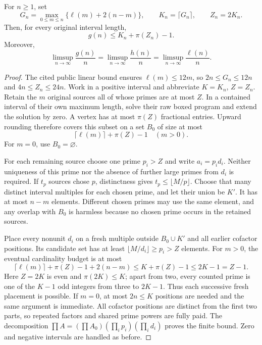 \begin{theorem}\label{thm:raw}
For $n\ge1$, set
\[
 G_n=\max_{0\le m\le n}\{\ell(m)+2(n-m)\},\qquad
 K_n=\lceil G_n\rceil,\qquad Z_n=2K_n.
\]
Then, for every original interval length,
\[
 g(n)\le K_n+\pi(Z_n)-1.
\]
Moreover,
\[
 \limsup_{n\to\infty}\frac{g(n)}n
 =\limsup_{n\to\infty}\frac{h(n)}n
 =\limsup_{n\to\infty}\frac{\ell(n)}n.
\]
\end{theorem}
\begin{proof}
The cited public linear bound ensures $\ell(m)\le12m$, so $2n\le G_n\le12n$ and $4n\le Z_n\le24n$. Work in a positive interval and abbreviate $K=K_n$, $Z=Z_n$. Retain the $m$ original sources all of whose primes are at most $Z$. In a contained interval of their own maximum length, solve their raw boxed program and extend the solution by zero. A vertex has at most $\pi(Z)$ fractional entries. Upward rounding therefore covers this subset on a set $B_0$ of size at most
\[
 \lceil\ell(m)\rceil+\pi(Z)-1\quad(m>0).
\]
For $m=0$, use $B_0=\varnothing$.

For each remaining source choose one prime $p_i>Z$ and write $a_i=p_id_i$. Neither uniqueness of this prime nor the absence of further large primes from $d_i$ is required. If $t_p$ sources chose $p$, distinctness gives $t_p\le\lfloor M/p\rfloor$. Choose that many distinct interval multiples for each chosen prime, and let their union be $K'$. It has at most $n-m$ elements. Different chosen primes may use the same element, and any overlap with $B_0$ is harmless because no chosen prime occurs in the retained sources.

Place every nonunit $d_i$ on a fresh multiple outside $B_0\cup K'$ and all earlier cofactor positions. Its candidate set has at least $\lfloor M/d_i\rfloor\ge p_i>Z$ elements. For $m>0$, the eventual cardinality budget is at most
\[
 \lceil\ell(m)\rceil+\pi(Z)-1+2(n-m)
 \le K+\pi(Z)-1\le2K-1=Z-1.
\]
Here $Z=2K$ is even and $\pi(2K)\le K$; apart from two, every counted prime is one of the $K-1$ odd integers from three to $2K-1$. Thus each successive fresh placement is possible. If $m=0$, at most $2n\le K$ positions are needed and the same argument is immediate. All cofactor positions are distinct from the first two parts, so repeated factors and shared prime powers are fully paid. The decomposition $\prod A=(\prod A_0)(\prod_i p_i)(\prod_i d_i)$ proves the finite bound. Zero and negative intervals are handled as before.


\end{proof}
